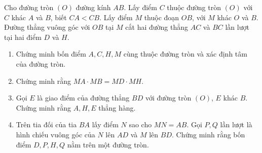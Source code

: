 \begin{ex}%
Cho đường tròn $(O)$ đường kính $AB$. Lấy điểm $C$ thuộc đường tròn $(O)$ với $C$ khác $A$ và $B$, biết $CA < CB$. Lấy điểm $M$ thuộc đoạn $OB$, với $M$ khác $O$ và $B$. Đường thẳng vuông góc với $OB$ tại $M$ cắt hai đường thẳng $AC$ và $BC$ lần lượt tại hai điểm $D$ và $H$.
\begin{enumerate}
	\item Chứng minh bốn điểm $A,C,H,M$ cùng thuộc đường tròn và xác định tâm của đường tròn.
	\item Chứng minh rằng $MA \cdot MB = MD \cdot MH.$
	\item Gọi $E$ là giao điểm của đường thẳng $BD$ với đường tròn $(O)$, $E$ khác $B$. Chứng minh rằng $A,H,E$ thẳng hàng.
	\item Trên tia đối của tia $BA$ lấy điểm $N$ sao cho $MN = AB$. Gọi $P,Q$ lần lượt là hình chiếu vuông góc của $N$ lên $AD$ và $M$ lên $BD$. Chứng minh rằng bốn điểm $D,P,H,Q$ nằm trên một đường tròn.
\end{enumerate} 
\end{ex}
